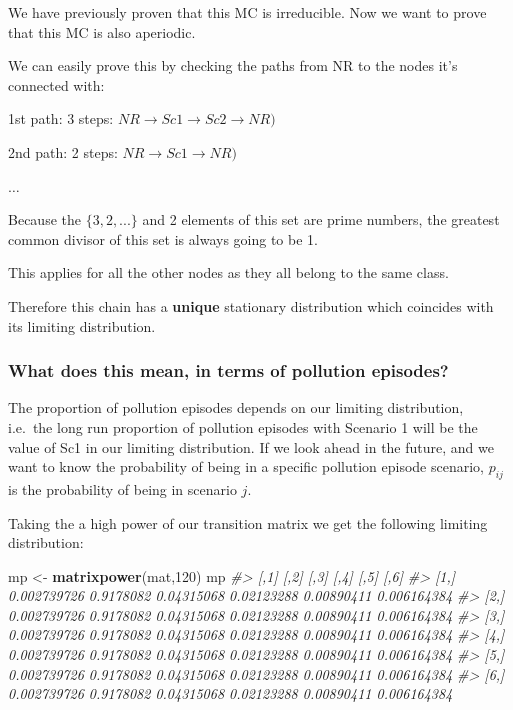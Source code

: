 \documentclass[]{article}
\newenvironment{Shaded}{\begin{snugshade}}{\end{snugshade}}
\newcommand{\CommentTok}[1]{\textcolor[rgb]{0.56,0.35,0.01}{\textit{#1}}}
\newcommand{\DecValTok}[1]{\textcolor[rgb]{0.00,0.00,0.81}{#1}}
\newcommand{\KeywordTok}[1]{\textcolor[rgb]{0.13,0.29,0.53}{\textbf{#1}}}
\newcommand{\NormalTok}[1]{#1}
\newcommand{\StringTok}[1]{\textcolor[rgb]{0.31,0.60,0.02}{#1}}
\begin{document}
We have previously proven that this MC is irreducible. Now we want to
prove that this MC is also aperiodic.

We can easily prove this by checking the paths from NR to the nodes it's
connected with:

1st path: 3 steps:
\(NR \rightarrow Sc1 \rightarrow Sc2 \rightarrow NR)\)

2nd path: 2 steps: \(NR \rightarrow Sc1 \rightarrow NR)\)

\(\dots\)

Because the \(\{3,2,...\}\) and 2 elements of this set are prime
numbers, the greatest common divisor of this set is always going to be
1.

This applies for all the other nodes as they all belong to the same
class.

Therefore this chain has a \textbf{unique} stationary distribution which
coincides with its limiting distribution.

\hypertarget{what-does-this-mean-in-terms-of-pollution-episodes}{%
\subsubsection{What does this mean, in terms of pollution
episodes?}\label{what-does-this-mean-in-terms-of-pollution-episodes}}

The proportion of pollution episodes depends on our limiting
distribution, i.e.~the long run proportion of pollution episodes with
Scenario 1 will be the value of Sc1 in our limiting distribution. If we
look ahead in the future, and we want to know the probability of being
in a specific pollution episode scenario, \(p_{ij}\) is the probability
of being in scenario \(j\).

Taking the a high power of our transition matrix we get the following
limiting distribution:

\begin{Shaded}
\begin{Highlighting}[]
\NormalTok{mp <-}\StringTok{ }\KeywordTok{matrixpower}\NormalTok{(mat,}\DecValTok{120}\NormalTok{)}
\NormalTok{mp}
\CommentTok{#>             [,1]      [,2]       [,3]       [,4]       [,5]        [,6]}
\CommentTok{#> [1,] 0.002739726 0.9178082 0.04315068 0.02123288 0.00890411 0.006164384}
\CommentTok{#> [2,] 0.002739726 0.9178082 0.04315068 0.02123288 0.00890411 0.006164384}
\CommentTok{#> [3,] 0.002739726 0.9178082 0.04315068 0.02123288 0.00890411 0.006164384}
\CommentTok{#> [4,] 0.002739726 0.9178082 0.04315068 0.02123288 0.00890411 0.006164384}
\CommentTok{#> [5,] 0.002739726 0.9178082 0.04315068 0.02123288 0.00890411 0.006164384}
\CommentTok{#> [6,] 0.002739726 0.9178082 0.04315068 0.02123288 0.00890411 0.006164384}
\end{Highlighting}
\end{Shaded}
\end{document}
